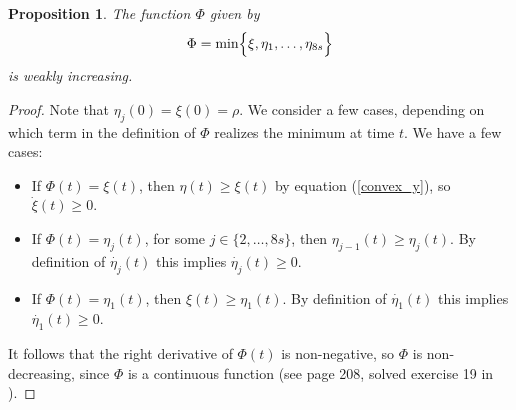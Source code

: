\documentclass[a4paper,12pt]{article}
\newtheorem{proposition}{Proposition}
\begin{document}
\begin{proposition} \label{prop:monotone_phi}
The function $\Phi$ given by
\begin{align} \label{phi_fun_basic}
\Phi = \min\Bigl\{  \xi, \eta_1, \ldots, \eta_{8s} \Bigr\}
\end{align}
is weakly increasing.
\end{proposition}
\begin{proof}
Note that $\eta_j(0) = \xi(0) = \rho$.
We consider a few cases, depending on which term in the definition of $\Phi$ realizes the minimum at time $t$. We have a few cases:
\begin{itemize}
	\item If $\Phi(t) = \xi(t)$, then $\eta(t) \geq \xi(t)$ by equation (\ref{convex_y}), so $\dot{\xi}(t) \geq 0$.
	\item If $\Phi(t) = \eta_j(t)$, for some $j \in \{2, \ldots, 8s\}$, then  $\eta_{j-1}(t) \geq \eta_j(t)$. By definition of $\dot{\eta_j}(t)$ this implies $\dot{\eta_j}(t) \geq 0$.
	\item If $\Phi(t) = \eta_1(t)$, then $\xi(t) \geq \eta_1(t)$. By definition of $\dot{\eta_1}(t)$ this implies $\dot{\eta_1}(t) \geq 0$.
\end{itemize}

\medskip

It follows that the right derivative of $\Phi(t)$ is non-negative, so $\Phi$ is non-decreasing, since $\Phi$ is a continuous function (see page 208, solved exercise 19 in \cite{hardy_book}).

\end{proof}
\end{document}
